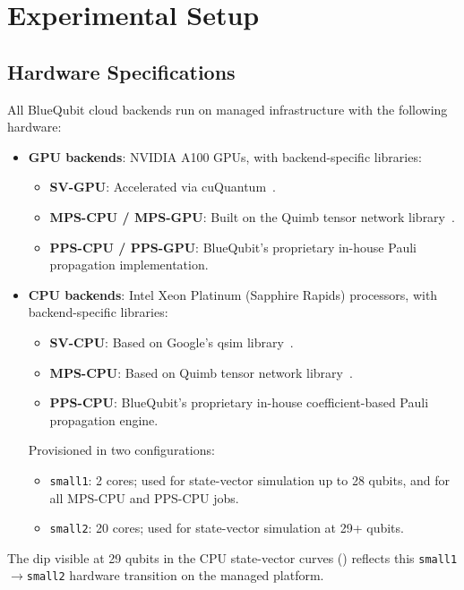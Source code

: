 \documentclass[conference,10pt]{IEEEtran}
\begin{document}
    \section{Experimental Setup}
    \label{sec:setup}

    \subsection{Hardware Specifications}
    All BlueQubit cloud backends run on managed infrastructure with the following hardware:
    \begin{itemize}
    \item \textbf{GPU backends}: NVIDIA A100 GPUs, with backend-specific libraries:
\begin{itemize}
    \item \textbf{SV-GPU}: Accelerated via cuQuantum~\cite{bayraktar2023cuquantum}.
    \item \textbf{MPS-CPU / MPS-GPU}: Built on the Quimb tensor network library~\cite{Gray2018}.
    \item \textbf{PPS-CPU / PPS-GPU}: BlueQubit's proprietary in-house Pauli propagation implementation.
\end{itemize}
    \item \textbf{CPU backends}: Intel Xeon Platinum (Sapphire Rapids) processors, with 
backend-specific libraries:
\begin{itemize}
    \item \textbf{SV-CPU}: Based on Google's qsim library~\cite{quantumai2020qsim}.
    \item \textbf{MPS-CPU}: Based on Quimb tensor network library~\cite{Gray2018}.
    \item \textbf{PPS-CPU}: BlueQubit's proprietary in-house coefficient-based Pauli 
    propagation engine.
\end{itemize}
Provisioned in two configurations:
    \begin{itemize}
        \item \texttt{small1}: 2 cores; used for state-vector simulation up to 28 qubits, and for all MPS-CPU and PPS-CPU jobs.
        \item \texttt{small2}: 20 cores; used for state-vector simulation at 29+ qubits.
    \end{itemize}
\end{itemize}
\noindent The dip visible at 29 qubits in the CPU state-vector curves 
() reflects this \texttt{small1}$\to$\texttt{small2} 
hardware transition on the managed platform.
\end{document}
